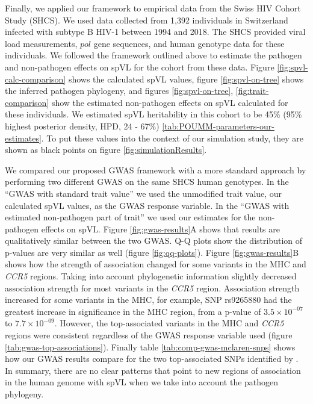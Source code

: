 \documentclass[]{article}
\begin{document}
\begin{doublespace}
Finally, we applied our framework to empirical data from the Swiss HIV Cohort Study (SHCS). We used data collected from 1,392 individuals in Switzerland infected with subtype B HIV-1 between 1994 and 2018. The SHCS provided viral load measurements, $pol$ gene sequences, and human genotype data for these individuals. We followed the framework outlined above to estimate the pathogen and non-pathogen effects on spVL for the cohort from these data. Figure \ref{fig:spvl-calc-comparison} shows the calculated spVL values, figure \ref{fig:spvl-on-tree} shows the inferred pathogen phylogeny, and figures \ref{fig:spvl-on-tree}, \ref{fig:trait-comparison} show the estimated non-pathogen effects on spVL calculated for these individuals. We estimated spVL heritability in this cohort to be 45\% (95\% highest posterior density, HPD, 24 - 67\%) \ref{tab:POUMM-parameters-our-estimates}. To put these values into the context of our simulation study, they are shown as black points on figure \ref{fig:simulationResults}.

We compared our proposed GWAS framework with a more standard approach by performing two different GWAS on the same SHCS human genotypes. In the ``GWAS with standard trait value'' we used the unmodified trait value, our calculated spVL values, as the GWAS response variable. In the ``GWAS with estimated non-pathogen part of trait'' we used our estimates for the non-pathogen effects on spVL. Figure \ref{fig:gwas-results}A shows that results are qualitatively similar between the two GWAS. Q-Q plots show the distribution of p-values are very similar as well (figure \ref{fig:qq-plots}). Figure \ref{fig:gwas-results}B shows how the strength of association changed for some variants in the MHC and \emph{CCR5} regions. Taking into account phylogenetic information slightly decreased association strength for most variants in the \emph{CCR5} region. Association strength increased for some variants in the MHC, for example, SNP rs9265880 had the greatest increase in significance in the MHC region, from a p-value of $3.5 \times 10^{-07}$ to $7.7 \times 10^{-09}$. However, the top-associated variants in the MHC and \emph{CCR5} regions were consistent regardless of the GWAS response variable used (figure \ref{tab:gwas-top-associations}). Finally table \ref{tab:comp-gwas-mclaren-snps} shows how our GWAS results compare for the two top-associated SNPs identified by \citet{McLaren2015}. In summary, there are no clear patterns that point to new regions of association in the human genome with spVL when we take into account the pathogen phylogeny.


\end{doublespace}
\end{document}
